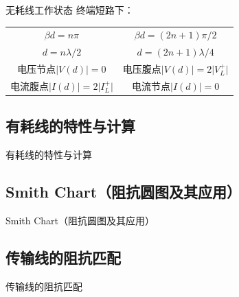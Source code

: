 \begin{frame}{无耗线工作状态}
  终端短路下：
  \centering
  \begin{tabular}{|c|c|}
    \hline
    $ \beta d=n\pi $ & $ \beta d=(2n+1)\pi/2 $ \\
    $ d=n\lambda/2 $ & $ d=(2n+1)\lambda/4 $ \\
    \hline
    $\text{电压节点}\lvert V(d)\rvert=0$ & $\text{电压腹点}\lvert V(d)\rvert=2\lvert V_{L}^{+}\rvert$ \\
    $\text{电流腹点}\lvert I(d)\rvert=2\lvert I_{L}^{+}\rvert$ &$ \text{电流节点}\lvert I(d)\rvert=0$ \\
    \hline
  \end{tabular}
\end{frame}

\subsection{有耗线的特性与计算}
\begin{frame}{有耗线的特性与计算}

\end{frame}

\subsection{Smith Chart（阻抗圆图及其应用）}
\begin{frame}{Smith Chart（阻抗圆图及其应用）}

\end{frame}

\subsection{传输线的阻抗匹配}
\begin{frame}{传输线的阻抗匹配}

\end{frame}
